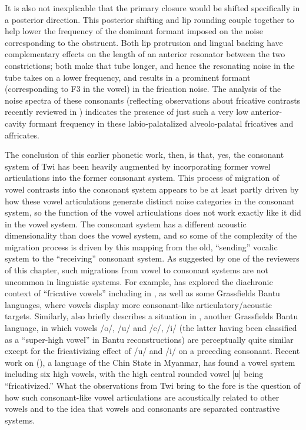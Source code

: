 \documentclass[output=paper,colorlinks,citecolor=brown]{langscibook}
\begin{document}
It is also not inexplicable that the primary closure would be shifted specifically in a posterior direction. This posterior shifting and lip rounding couple together to help lower the frequency of the dominant formant imposed on the noise corresponding to the obstruent. Both lip protrusion and lingual backing have complementary effects on the length of an anterior resonator between the two constrictions; both make that tube longer, and hence the resonating noise in the tube takes on a lower frequency, and results in a prominent formant (corresponding to F3 in the vowel) in the frication noise. The analysis of the noise spectra of these consonants (reflecting observations about fricative contrasts recently reviewed in \citealt{Shadle2023}) indicates the presence of just such a very low anterior-cavity formant frequency in these labio-palatalized alveolo-palatal fricatives and affricates. 

The conclusion of this earlier phonetic work, then, is that, yes, the consonant system of Twi has been heavily augmented by incorporating former vowel articulations into the former consonant system. This process of migration of vowel contrasts into the consonant system appears to be at least partly driven by how these vowel articulations generate distinct noise categories in the consonant system, so the function of the vowel articulations does not work exactly like it did in the vowel system. The consonant system has a different acoustic dimensionality than does the vowel system, and so some of the complexity of the migration process is driven by this mapping from the old, ``sending'' vocalic system to the ``receiving'' consonant system. As suggested by one of the reviewers of this chapter, such migrations from vowel to consonant systems are not uncommon in linguistic systems. For example, \citet{Faytak2022} has explored the diachronic context  of ``fricative vowels'' including in , as well as some Grassfields Bantu languages, where vowels display more consonant-like articulatory/acoustic targets. Similarly, \citet{Voorhoeve1976} also briefly describes a situation in , another Grassfields Bantu language, in which vowels /o/, /u/ and /e/, /i/ (the latter having been classified as a ``super-high vowel'' in Bantu reconstructions) are perceptually quite similar except for the fricativizing effect of /u/ and /i/ on a preceding consonant. Recent work on  (\cite{Bohnertetal2022}), a language of the Chin State in Myanmar, has found a vowel system including six high vowels, with the high central rounded vowel [ʉ] being ``fricativized.'' What the observations from Twi bring to the fore is the question of how such consonant-like vowel articulations are acoustically related to other vowels and to the idea that vowels and consonants are separated contrastive systems. 
\end{document}
